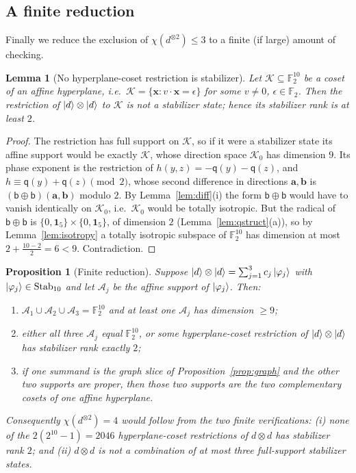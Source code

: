 \documentclass[11pt]{article}
\theoremstyle{plain}
\newtheorem{lemma}[theorem]{Lemma}
\newtheorem{proposition}[theorem]{Proposition}
\theoremstyle{definition}
\newcommand{\F}{\mathbb{F}}
\newcommand{\Stab}{\mathrm{Stab}}
\newcommand{\qq}{\mathsf{q}}
\newcommand{\bb}{\mathsf{b}}
\newcommand{\one}{\mathbf{1}}
\begin{document}
\subsection{A finite reduction}

Finally we reduce the exclusion of $\chi(d^{\otimes2})\le3$ to a finite (if large)
amount of checking.

\begin{lemma}[No hyperplane-coset restriction is stabilizer]\label{lem:norestr}
Let $\mathcal K\subseteq\F_2^{10}$ be a coset of an affine hyperplane, i.e.\
$\mathcal K=\{\mathbf x:v\cdot \mathbf x=\epsilon\}$ for some $v\ne0$, $\epsilon\in\F_2$. Then the
restriction of $\ket d\otimes\ket d$ to $\mathcal K$ is not a stabilizer state; hence
its stabilizer rank is at least $2$.
\end{lemma}

\begin{proof}
The restriction has full support on $\mathcal K$, so if it were a stabilizer state its
affine support would be exactly $\mathcal K$, whose direction space $\mathcal K_0$ has
dimension $9$. Its phase exponent is the restriction of
$h(y,z)=-\qq(y)-\qq(z)$, and $h\equiv \qq(y)+\qq(z)\pmod2$, whose second difference in
directions $\mathbf a,\mathbf b$ is $(\bb\oplus\bb)(\mathbf a,\mathbf b)$ modulo $2$. By
Lemma~\ref{lem:diff}(i) the form $\bb\oplus\bb$ would have to vanish identically on
$\mathcal K_0$, i.e.\ $\mathcal K_0$ would be totally isotropic. But the radical of
$\bb\oplus\bb$ is $\{0,\one_5\}\times\{0,\one_5\}$, of dimension $2$
(Lemma~\ref{lem:qstruct}(a)), so by Lemma~\ref{lem:isotropy} a totally isotropic
subspace of $\F_2^{10}$ has dimension at most $2+\frac{10-2}2=6<9$. Contradiction.
\end{proof}

\begin{proposition}[Finite reduction]\label{prop:reduction}
Suppose $\ket d\otimes\ket d=\sum_{j=1}^3c_j\ket{\varphi_j}$ with
$\ket{\varphi_j}\in\Stab_{10}$ and let $\mathcal A_j$ be the affine support of
$\ket{\varphi_j}$. Then:
\begin{enumerate}[label=(\alph*)]
\item $\mathcal A_1\cup\mathcal A_2\cup\mathcal A_3=\F_2^{10}$ and at least one
$\mathcal A_j$ has dimension $\ge9$;
\item either all three $\mathcal A_j$ equal $\F_2^{10}$, or some hyperplane-coset
restriction of $\ket d\otimes\ket d$ has stabilizer rank exactly $2$;
\item if one summand is the graph slice of Proposition~\ref{prop:graph} and the other
two supports are proper, then those two supports are the two complementary cosets of
one affine hyperplane.
\end{enumerate}
Consequently $\chi(d^{\otimes2})=4$ would follow from the two finite verifications:
(i) none of the $2(2^{10}-1)=2046$ hyperplane-coset restrictions of $d\otimes d$ has
stabilizer rank $2$; and (ii) $d\otimes d$ is not a combination of at most three
full-support stabilizer states.
\end{proposition}
\end{document}

